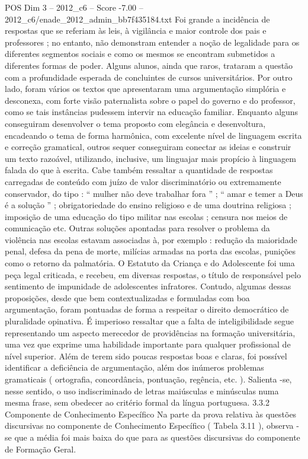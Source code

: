 \begin{textsample}{POS Dim 3 – 2012\_c6 – Score -7.00 – 2012\_c6/enade\_2012\_admin\_bb7f435184.txt}
Foi grande a incidência de respostas que se referiam às leis, à vigilância e maior controle dos pais e professores ; no entanto, não demonstram entender a noção de legalidade para os diferentes segmentos sociais e como os mesmos se encontram submetidos a diferentes formas de poder.
Alguns alunos, ainda que raros, trataram a questão com a profundidade esperada de concluintes de cursos universitários.
Por outro lado, foram vários os textos que apresentaram uma argumentação simplória e desconexa, com forte visão paternalista sobre o papel do governo e do professor, como se tais instâncias pudessem intervir na educação familiar.
Enquanto alguns conseguiram desenvolver o tema proposto com elegância e desenvoltura, encadeando o tema de forma harmônica, com excelente nível de linguagem escrita e correção gramatical, outros sequer conseguiram conectar as ideias e construir um texto razoável, utilizando, inclusive, um linguajar mais propício à linguagem falada do que à escrita.
Cabe também ressaltar a quantidade de respostas carregadas de conteúdo com juízo de valor discriminatório ou extremamente conservador, do tipo : “ mulher não deve trabalhar fora ” ; “ amar e temer a Deus é a solução ” ; obrigatoriedade do ensino religioso e de uma doutrina religiosa ; imposição de uma educação do tipo militar nas escolas ; censura nos meios de comunicação etc.
Outras soluções apontadas para resolver o problema da violência nas escolas estavam associadas à, por exemplo : redução da maioridade penal, defesa da pena de morte, milícias armadas na porta das escolas, punições como o retorno da palmatória.
O Estatuto da Criança e do Adolescente foi uma peça legal criticada, e recebeu, em diversas respostas, o título de responsável pelo sentimento de impunidade de adolescentes infratores.
Contudo, algumas dessas proposições, desde que bem contextualizadas e formuladas com boa argumentação, foram pontuadas de forma a respeitar o direito democrático de pluralidade opinativa.
É imperioso ressaltar que a falta de inteligibilidade segue representando um aspecto merecedor de providências na formação universitária, uma vez que exprime uma habilidade importante para qualquer profissional de nível superior.
Além de terem sido poucas respostas boas e claras, foi possível identificar a deficiência de argumentação, além dos inúmeros problemas gramaticais ( ortografia, concordância, pontuação, regência, etc. ).
Salienta -se, nesse sentido, o uso indiscriminado de letras maiúsculas e minúsculas numa mesma frase, sem obedecer ao critério formal da língua portuguesa. 3.3.2 Componente de Conhecimento Específico Na parte da prova relativa às questões discursivas no componente de Conhecimento Específico ( Tabela 3.11 ), observa -se que a média foi mais baixa do que para as questões discursivas do componente de Formação Geral.

\end{textsample}
